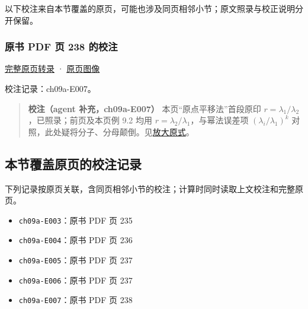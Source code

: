 \documentclass[
  10pt,
  fontset=fandol]{ctexart}
\providecommand{\tightlist}{%
  \setlength{\itemsep}{0pt}\setlength{\parskip}{0pt}}
\begin{document}
以下校注来自本节覆盖的原页，可能也涉及同页相邻小节；原文照录与校正说明分开保留。

\subsubsection{原书 PDF 页 238 的校注}\label{ux539fux4e66-pdf-ux9875-238-ux7684ux6821ux6ce8}

\href{../pages/pdf-238.md}{完整原页转录} · \href{../../source-images/pdf-238.jpeg}{原页图像}

校注记录：ch09a-E007。

\begin{quote}
\textbf{校注（agent 补充，ch09a-E007）} 本页``原点平移法''首段原印 \(r=\lambda_1/\lambda_2\)，已照录；前页及本页例 9.2 均用 \(r=\lambda_2/\lambda_1\)，与幂法误差项 \((\lambda_i/\lambda_1)^k\) 对照，此处疑将分子、分母颠倒。见\href{../assets/ch09a/review-p238-ratio.png}{放大原式}。
\end{quote}

\subsection{本节覆盖原页的校注记录}\label{ux672cux8282ux8986ux76d6ux539fux9875ux7684ux6821ux6ce8ux8bb0ux5f55}

下列记录按原页关联，含同页相邻小节的校注；计算时同时读取上文校注和完整原页。

\begin{itemize}
\tightlist
\item
  \texttt{ch09a-E003}：原书 PDF 页 235
\item
  \texttt{ch09a-E004}：原书 PDF 页 236
\item
  \texttt{ch09a-E005}：原书 PDF 页 237
\item
  \texttt{ch09a-E006}：原书 PDF 页 237
\item
  \texttt{ch09a-E007}：原书 PDF 页 238
\end{itemize}
\end{document}
